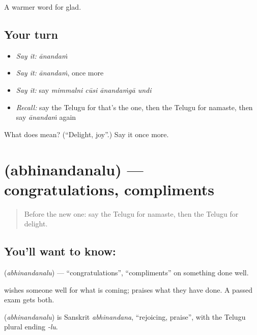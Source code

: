 \begin{grammarlens}[title={What you've built}]
A warmer word for glad.
\end{grammarlens}

\subsection*{Your turn}
\begin{itemize}
\raggedright
  \item \emph{Say it:} \emph{ānandaṁ}
  \item \emph{Say it:} \emph{ānandaṁ}, once more
  \item \emph{Say it:} say \emph{mimmalni cūsi ānandaṁgā undi}
  \item \emph{Recall:} say the Telugu for that's the one, then the Telugu for namaste, then say \emph{ānandaṁ} again
\end{itemize}

\begin{tcolorbox}[breakable,colback=teal!4,colframe=teal!35!black,title={Before you move on}]
What does  mean? (\textquotedblleft{}Delight, joy\textquotedblright{}.) Say it once more.
\end{tcolorbox}
\section[\texorpdfstring{\te{అభినందనలు} (abhinandanalu)}{అభినందనలు (abhinandanalu)}]{ (abhinandanalu) — congratulations, compliments}

\label{lesson:TE-C99-congrats}



\begin{quote}
Before the new one: say the Telugu for namaste, then the Telugu for delight.
\end{quote}

\subsection*{You'll want to know: }
\textbf{} (\emph{abhinandanalu}) — \textquotedblleft{}congratulations\textquotedblright{}, \textquotedblleft{}compliments\textquotedblright{} on something done well.

\textbf{} wishes someone well for what is coming; \textbf{} praises what they have done. A passed exam gets both.

\begin{cousinweb}
\textbf{} (\emph{abhinandanalu}) is Sanskrit \emph{abhinandana}, \textquotedblleft{}rejoicing, praise\textquotedblright{}, with the Telugu plural ending \emph{-lu}.
\end{cousinweb}

